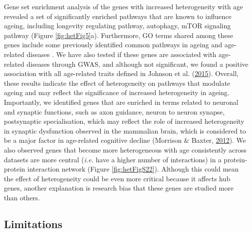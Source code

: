 \documentclass[12pt,twoside]{unicam}
\begin{document}
Gene set enrichment analysis of the genes with increased heterogeneity with age revealed a set of significantly enriched pathways that are known to influence ageing, including longevity regulating pathway, autophagy, mTOR signaling pathway (Figure \ref{fig:hetFig5}a). Furthermore, GO terms shared among these genes include some previously identified common pathways in ageing and age-related diseases
. We have also tested if these genes are associated with age-related diseases through GWAS, and although not significant, we found a positive association with all age-related traits defined in Johnson et al. (\protect\hyperlink{ref-Johnson2015}{2015}). Overall, these results indicate the effect of heterogeneity on pathways that modulate ageing and may reflect the significance of increased heterogeneity in ageing. Importantly, we identified genes that are enriched in terms related to neuronal and synaptic functions, such as axon guidance, neuron to neuron synapse, postsynaptic specialisation, which may reflect the role of increased heterogeneity in synaptic dysfunction observed in the mammalian brain, which is considered to be a major factor in age-related cognitive decline (Morrison \& Baxter, \protect\hyperlink{ref-Morrison2012}{2012}). We also observed genes that become more heterogeneous with age consistently across datasets are more central (\emph{i.e.} have a higher number of interactions) in a protein-protein interaction network (Figure \ref{fig:hetFigS22}). Although this could mean the effect of heterogeneity could be even more critical because it affects hub genes, another explanation is research bias that these genes are studied more than others.

\hypertarget{limitations}{%
\subsection{Limitations}\label{limitations}}
\end{document}
